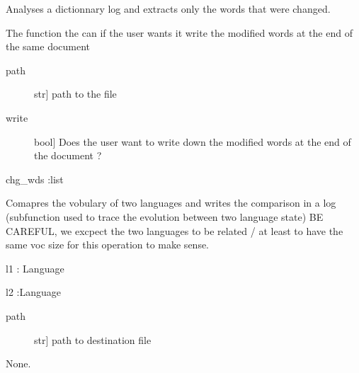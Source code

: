 \documentclass[letterpaper,10pt,english]{sphinxmanual}
\begin{document}
\begin{fulllineitems}
\label{\detokenize{index:log_utilities.extract_changed_words}}
\sphinxAtStartPar
Analyses a dictionnary log and extracts only the words that were changed.

\sphinxAtStartPar
The function the can if the user wants it write the modified words at the end of the same document
\begin{description}
\item[{path}] \leavevmode{[}str{]}
\sphinxAtStartPar
path to the file

\item[{write}] \leavevmode{[}bool{]}
\sphinxAtStartPar
Does the user want to write down the modified words at the end of the document ?

\end{description}

\sphinxAtStartPar
chg\_wds :list

\end{fulllineitems}


\begin{fulllineitems}
\label{\detokenize{index:log_utilities.langcomp2log}}
\sphinxAtStartPar
Comapres the vobulary of two languages and writes the comparison in a log (subfunction used to trace the evolution between two language state)
BE CAREFUL, we excpect the two languages to be related / at least to have the same voc size for this operation to make sense.

\sphinxAtStartPar
l1 : Language

\sphinxAtStartPar
l2 :Language
\begin{description}
\item[{path}] \leavevmode{[}str{]}
\sphinxAtStartPar
path to destination file

\end{description}

\sphinxAtStartPar
None.

\end{fulllineitems}
\end{document}
